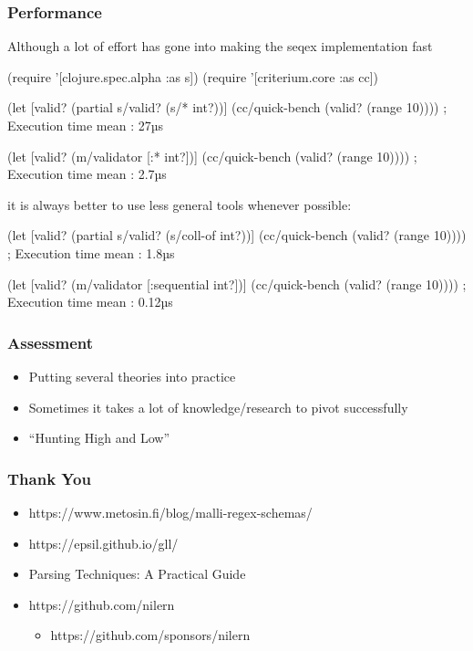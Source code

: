 \documentclass{beamer}
\begin{document}
\begin{frame}[fragile]
\frametitle{Performance}

\begin{displayquote}
Although a lot of effort has gone into making the seqex implementation fast
\end{displayquote}

{\tiny
\begin{semiverbatim}
(require '[clojure.spec.alpha :as s])
(require '[criterium.core :as cc])

(let [valid? (partial s/valid? (s/* int?))]
  (cc/quick-bench (valid? (range 10)))) ; Execution time mean : 27µs

(let [valid? (m/validator [:* int?])]
  (cc/quick-bench (valid? (range 10)))) ; Execution time mean : 2.7µs
\end{semiverbatim}
}

\begin{displayquote}
it is always better to use less general tools whenever possible:
\end{displayquote}

{\tiny
\begin{semiverbatim}
(let [valid? (partial s/valid? (s/coll-of int?))]
  (cc/quick-bench (valid? (range 10)))) ; Execution time mean : 1.8µs

(let [valid? (m/validator [:sequential int?])]
  (cc/quick-bench (valid? (range 10)))) ; Execution time mean : 0.12µs
\end{semiverbatim}
}
\end{frame}


\begin{frame}
\frametitle{Assessment}

\begin{itemize}
\item Putting several theories into practice
\item Sometimes it takes a lot of knowledge/research to pivot successfully
\item ``Hunting High and Low''
\end{itemize}
\end{frame}


\begin{frame}
\frametitle{Thank You}

\begin{itemize}
\item https://www.metosin.fi/blog/malli-regex-schemas/
\item https://epsil.github.io/gll/
\item Parsing Techniques: A Practical Guide
\item https://github.com/nilern
\begin{itemize}
    \item https://github.com/sponsors/nilern
\end{itemize}

\end{itemize}
\end{frame}
\end{document}
